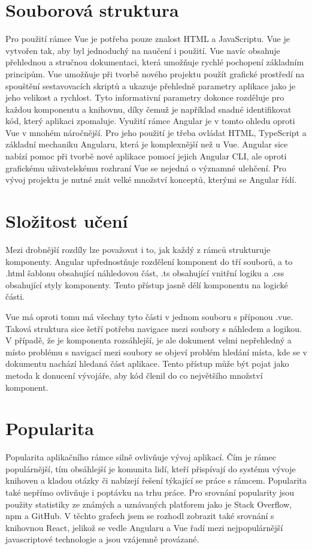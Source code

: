 	\section{Souborová struktura}
Pro použití rámce Vue je potřeba pouze znalost HTML a JavaScriptu. Vue je vytvořen tak, aby byl jednoduchý na naučení i použití. Vue navíc obsahuje přehlednou a stručnou dokumentaci, která umožňuje rychlé pochopení základním principům. Vue umožňuje při tvorbě nového projektu použít grafické prostředí na spouštění sestavovacích skriptů a ukazuje přehledně parametry aplikace jako je jeho velikost a rychlost. Tyto informativní parametry dokonce rozděluje pro každou komponentu a knihovnu, díky čemuž je například snadné identifikovat kód, který aplikaci zpomaluje. 
Využití rámce Angular je v tomto ohledu oproti Vue v mnohém náročnější. Pro jeho použití je třeba ovládat HTML, TypeScript a základní mechaniku Angularu, která je komplexnější než u Vue. Angular sice nabízí pomoc při tvorbě nové aplikace pomocí jejich Angular CLI, ale oproti grafickému uživatelskému rozhraní Vue se nejedná o významné ulehčení. Pro vývoj projektu je nutné znát velké množství konceptů, kterými se Angular řídí.

    \section{Složitost učení}
Mezi drobnější rozdíly lze považovat i to, jak každý z rámců strukturuje komponenty. Angular upřednostňuje rozdělení komponent do tří souborů, a to .html šablonu obsahující náhledovou část, .ts obsahující vnitřní logiku a .css obsahující styly komponenty. Tento přístup jasně dělí komponentu na logické části. 

Vue má oproti tomu má všechny tyto části v jednom souboru s příponou .vue. Taková struktura sice šetří potřebu navigace mezi soubory s náhledem a logikou. V případě, že je komponenta rozsáhlejší, je ale dokument velmi nepřehledný a místo problému s navigací mezi soubory se objeví problém hledání místa, kde se v dokumentu nachází hledaná část aplikace. Tento přístup může být pojat jako metoda k donucení vývojáře, aby kód členil do co největšího množství komponent.

    \section{Popularita}
Popularita aplikačního rámce silně ovlivňuje vývoj aplikací. Čím je rámec populárnější, tím obsáhlejší je komunita lidí, kteří přispívají do systému vývoje knihoven a kladou otázky či nabízejí řešení týkající se práce s rámcem. Popularita také nepřímo ovlivňuje i poptávku na trhu práce. Pro srovnání popularity jsou použity statistiky ze známých a uznávaných platforem jako je Stack Overflow, npm a GitHub. V těchto grafech jsem se rozhodl zobrazit také srovnání s knihovnou React, jelikož se vedle Angularu a Vue řadí mezi nejpopulárnější javascriptové technologie a jsou vzájemně provázané.

